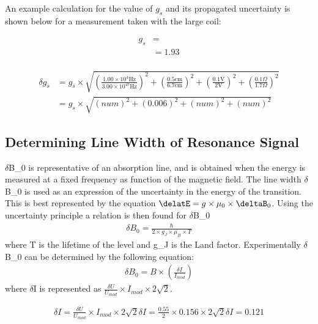 \documentclass[a4paper]{article}
\begin{document}
An example calculation for the value of $g_s$ and its propagated uncertainty is shown below for a measurement taken with the large coil:

\begin{align*}
g_s &= \\
    &= 1.93 \\
\end{align*}

\begin{align*}
\delta g_s &=
		   g_s \times 
              \sqrt {
              		  \left( \frac{1.00 \times 10^4 \text{Hz}}{3.00 \times 10^47 \text{Hz}} \right) ^2
              		+ \left( \frac{0.5 \text{cm}}{6.7 \text{cm}} \right) ^2
              		+ \left( \frac{0.1 \text{V}}{2 \text{V}} \right) ^2
              		+ \left( \frac{0.1 \Omega}{1.7 \Omega} \right) ^2
					} \\
		  &= g_s \times 
              \sqrt {
              		  \left( num \right) ^2
              		+ \left( 0.006 \right) ^2
              		+ \left( num \right) ^2
              		+ \left( num \right) ^2
					}
\end{align*}

\subsection{Determining Line Width of Resonance Signal}
\qq $\delta$B_0 is representative of an absorption line, and is
obtained when the energy is measured at a fixed frequency as function
of the magnetic field. The line width $\delta$B_0 is used as an
expression of the uncertainty in the energy of the transition. This is
best represented by the equation $\delatE = g \times \mu_0 \times
\deltaB_0$. Using the uncertainty principle a relation is then found
for $\delta$B_0
\begin{align*}
\delta B_0 = \frac{\hbar}{2 \times g_J \times \mu_B \times T}
\end{align*}
where T is the lifetime of the level and g_J is the Land
factor. Experimentally $\delta$B_0 can be determined by the following equation:
\begin{align*}
\delta B_0 = B \times (\frac{\delta I}{I_{mod}})
\end{align*}
where $\delta$I is represented as $\frac{\delta U}{U_{mod}} \times  I_{mod} \times 2\sqrt{2}$. 

\begin{align*}
\delta I = \frac{\delta U}{U_{mod}} \times  I_{mod} \times 2\sqrt{2}
\delta I = \frac{0.55}{2} \times 0.156 \times 2\sqrt{2}
\delta I = 0.121
\end{align*}
\end{document}
